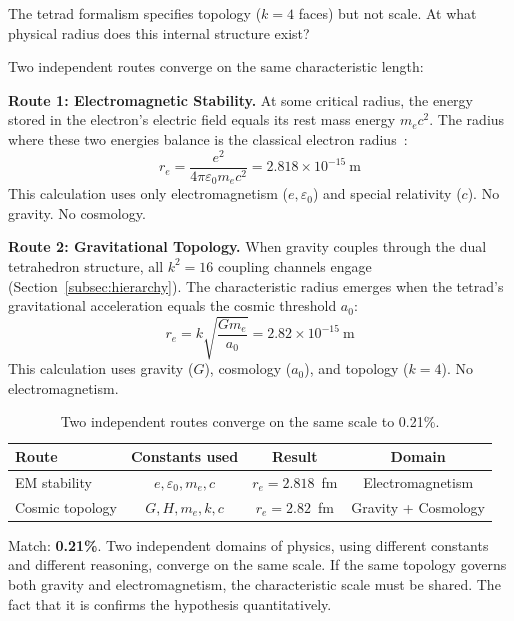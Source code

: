 \documentclass[aps,prd,preprint,superscriptaddress,showpacs,preprintnumbers,amsmath,amssymb,nofootinbib]{revtex4-2}
\begin{document}
The tetrad formalism specifies topology ($k = 4$ faces) but not scale. At what physical radius does this internal structure exist?

Two independent routes converge on the same characteristic length:

\textbf{Route 1: Electromagnetic Stability.} At some critical radius, the energy stored in the electron's electric field equals its rest mass energy $m_e c^2$. The radius where these two energies balance is the classical electron radius~\cite{jackson1999}:
\begin{equation}
r_e = \frac{e^2}{4\pi\varepsilon_0 m_e c^2} = 2.818 \times 10^{-15}~\text{m}
\end{equation}
This calculation uses only electromagnetism ($e, \varepsilon_0$) and special relativity ($c$). No gravity. No cosmology.

\textbf{Route 2: Gravitational Topology.} When gravity couples through the dual tetrahedron structure, all $k^2 = 16$ coupling channels engage (Section~\ref{subsec:hierarchy}). The characteristic radius emerges when the tetrad's gravitational acceleration equals the cosmic threshold $a_0$:
\begin{equation}
r_e = k\sqrt{\frac{Gm_e}{a_0}} = 2.82 \times 10^{-15}~\text{m}
\end{equation}
This calculation uses gravity ($G$), cosmology ($a_0$), and topology ($k = 4$). No electromagnetism.

\begin{table}[H]
\centering
\begin{tabular*}{0.95\textwidth}{@{\extracolsep{\fill}} lccc @{}}
\toprule
\textbf{Route} & \textbf{Constants used} & \textbf{Result} & \textbf{Domain} \\
\midrule
EM stability & $e, \varepsilon_0, m_e, c$ & $r_e = 2.818$~fm & Electromagnetism \\
Cosmic topology & $G, H, m_e, k, c$ & $r_e = 2.82$~fm & Gravity + Cosmology \\
\bottomrule
\end{tabular*}
\caption{Two independent routes converge on the same scale to 0.21\%.}
\label{tab:convergence}
\end{table}

Match: \textbf{0.21\%}. Two independent domains of physics, using different constants and different reasoning, converge on the same scale. If the same topology governs both gravity and electromagnetism, the characteristic scale must be shared. The fact that it is confirms the hypothesis quantitatively.
\end{document}
